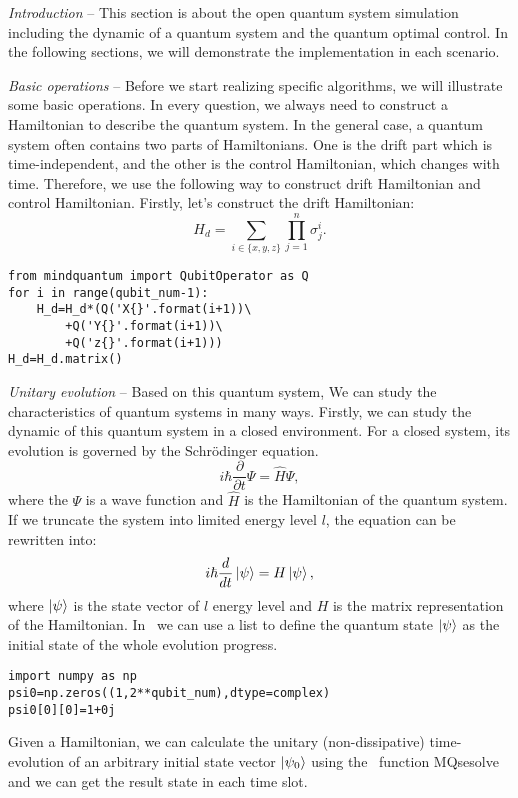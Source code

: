 \textit{Introduction} -- This section is about the open quantum system simulation including the dynamic of a quantum system and the quantum optimal control. In the following sections, we will demonstrate the implementation in each scenario.

\textit{Basic operations} -- Before we start realizing specific algorithms, we will illustrate some basic operations. In every question, we always need to construct a Hamiltonian to describe the quantum system. In the general case, a quantum system often contains two parts of Hamiltonians. One is the drift part which is time-independent, and the other is the control Hamiltonian, which changes with time. Therefore, we use the following way to construct drift Hamiltonian and control Hamiltonian. Firstly, let's construct the drift Hamiltonian:
\begin{equation}
    H_{d}=\sum_{i\in\{x,y,z\}}\prod_{j=1}^{n}\sigma_{j}^{i}.
\end{equation}
\begin{lstlisting}
from mindquantum import QubitOperator as Q
for i in range(qubit_num-1):
    H_d=H_d*(Q('X{}'.format(i+1))\
        +Q('Y{}'.format(i+1))\
        +Q('z{}'.format(i+1)))
H_d=H_d.matrix()
\end{lstlisting}
\textit{Unitary evolution} -- Based on this quantum system, We can study the characteristics of quantum systems in many ways. Firstly, we can study the dynamic of this quantum system in a closed environment. For a closed system, its evolution is governed by the Schrödinger equation.
\begin{equation}
    i\hbar\frac{\partial}{\partial t}\Psi=\hat{H}\Psi,
\end{equation}
where the $\Psi$ is a wave function and $\hat{H}$ is the Hamiltonian of the quantum system. If we truncate the system into limited energy level $l$, the equation can be rewritten into:
\begin{equation}
    i\hbar\frac{d}{dt}\ket{\psi}=H\ket{\psi},
    \label{shro}
\end{equation}
where $\ket{\psi}$ is the state vector of $l$ energy level and $H$ is the matrix representation of the Hamiltonian. In \MindQuantum\ we can use a list to define the quantum state $\ket{\psi}$ as the initial state of the whole evolution progress.
\begin{lstlisting}
import numpy as np
psi0=np.zeros((1,2**qubit_num),dtype=complex)
psi0[0][0]=1+0j
\end{lstlisting}
Given a Hamiltonian, we can calculate the unitary (non-dissipative) time-evolution of an arbitrary initial state vector $\ket{\psi_{0}}$ using the \MindQuantum\ function MQsesolve and we can get the result state in each time slot.
